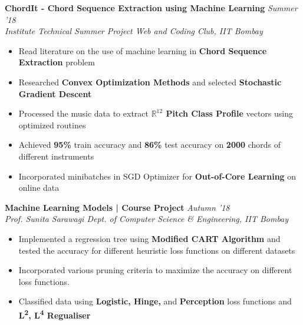 \documentclass[11pt]{article}%
\begin{document}
{\flushleft \bf \large{ChordIt - Chord Sequence Extraction using Machine Learning}} \hfill {{{\em {Summer '18}}}}\\
{\em{Institute Technical Summer Project \textbar Web and Coding Club, IIT Bombay}}
\begin{itemize}
\vspace{-0.2cm}
\setlength\itemsep{0.01em}
\item Read literature on the use of machine learning in {\bf Chord Sequence Extraction} problem
\vspace{-1.2mm}
\item Researched {\bf Convex Optimization Methods} and selected {\bf Stochastic Gradient Descent}
\vspace{-1.2mm}
\item  Processed the music data to extract {\bf $\mathbb{R}^{12}$ Pitch Class Profile} vectors using optimized routines
\vspace{-1.2mm}
\item Achieved {\bf 95\%} train accuracy and {\bf 86\%} test accuracy on {\bf 2000} chords of different instruments
\vspace{-1.2mm}
\item  Incorporated minibatches in SGD Optimizer for {\bf Out-of-Core Learning} on online data
\vspace{-1.2mm}
\end{itemize}
\vspace{-4mm}

{\flushleft \bf \large{Machine Learning Models | Course Project}} \hfill {{{\em{Autumn '18}}}} \\
{\em{Prof. Sunita Sarawagi \textbar Dept. of Computer Science \& Engineering, IIT Bombay}}
\vspace{-1mm}
\begin{itemize}
\setlength\itemsep{0.01em}
\vspace{-1mm}
\item Implemented a regression tree using {\bf Modified CART Algorithm} and tested the accuracy for
different heuristic loss functions on different datasets
\vspace{-1mm}
\item Incorporated various pruning criteria to maximize the accuracy on different loss functions.
\vspace{-1mm}
\item Classified data using {\bf Logistic, Hinge,} and {\bf Perception} loss functions and {\bf L\textsuperscript{2}, L\textsuperscript{4} Regualiser}
\end{itemize}
\vspace{-0.5cm}
\end{document}
